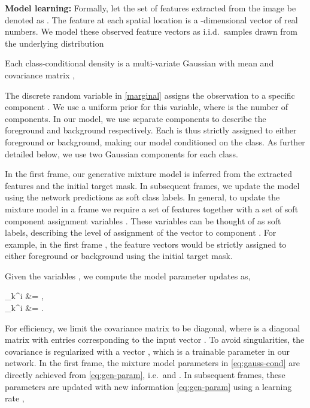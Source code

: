 \documentclass[10pt,twocolumn,letterpaper]{article}
\newcommand{\parsection}[1]{\noindent\textbf{#1:} }
\begin{document}
\parsection{Model learning}
Formally, let the set of features extracted from the image be denoted as . The feature  at each spatial location  is a -dimensional vector of real numbers. We model these observed feature vectors as i.i.d.\ samples drawn from the underlying distribution

Each class-conditional density is a multi-variate Gaussian with mean  and covariance matrix , 

The discrete random variable  in \eqref{marginal} assigns the observation  to a specific component . We use a uniform prior  for this variable, where  is the number of components. In our model, we use separate components  to describe the foreground and background respectively. Each  is thus strictly assigned to either foreground or background, making our model conditioned on the class. As further detailed below, we use two Gaussian components for each class.

In the first frame, our generative mixture model is inferred from the extracted features and the initial target mask. In subsequent frames, we update the model using the network predictions as soft class labels. In general, to update the mixture model in a frame  we require a set of features  together with a set of soft component assignment variables . These variables can be thought of as soft labels, describing the level of assignment of the vector  to component . For example, in the first frame , the feature vectors would be strictly assigned to either foreground or background  using the initial target mask. 

Given the variables , we compute the model parameter updates as,

		\bm{\tilde{\mu}}_k^{i} &= \enspace,\label{muest}\\
		\bm{\tilde{\Sigma}}_k^{i} &= \enspace.\label{covest}
	
For efficiency, we limit the covariance matrix to be diagonal, where  is a diagonal matrix with entries corresponding to the input vector . To avoid singularities, the covariance is regularized with a vector , which is a trainable parameter in our network. In the first frame, the mixture model parameters in \eqref{eq:gauss-cond} are directly achieved from \eqref{eq:gen-param}, i.e.\  and . In subsequent frames, these parameters are updated with new information \eqref{eq:gen-param} using a learning rate ,
\end{document}
